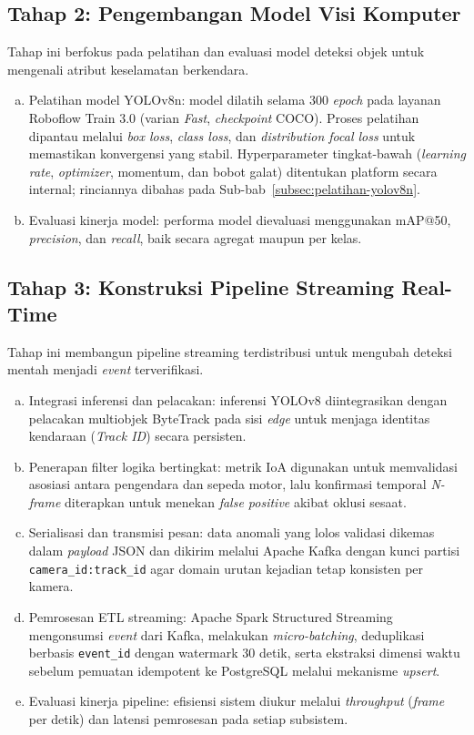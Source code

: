 \subsection{Tahap 2: Pengembangan Model Visi Komputer}
Tahap ini berfokus pada pelatihan dan evaluasi model deteksi objek untuk mengenali atribut keselamatan berkendara.
\begin{enumerate}[a.]
\item {Pelatihan model YOLOv8n}: model dilatih selama 300 \textit{epoch} pada layanan Roboflow Train 3.0 (varian \textit{Fast}, \textit{checkpoint} COCO). Proses pelatihan dipantau melalui \textit{box loss}, \textit{class loss}, dan \textit{distribution focal loss} untuk memastikan konvergensi yang stabil. Hyperparameter tingkat-bawah (\textit{learning rate}, \textit{optimizer}, momentum, dan bobot galat) ditentukan platform secara internal; rinciannya dibahas pada Sub-bab~\ref{subsec:pelatihan-yolov8n}.
\item {Evaluasi kinerja model}: performa model dievaluasi menggunakan mAP@50, \textit{precision}, dan \textit{recall}, baik secara agregat maupun per kelas.
\end{enumerate}

\subsection{Tahap 3: Konstruksi Pipeline Streaming Real-Time}
Tahap ini membangun pipeline streaming terdistribusi untuk mengubah deteksi mentah menjadi \textit{event} terverifikasi.
\begin{enumerate}[a.]
\item {Integrasi inferensi dan pelacakan}: inferensi YOLOv8 diintegrasikan dengan pelacakan multiobjek ByteTrack pada sisi \textit{edge} untuk menjaga identitas kendaraan (\textit{Track ID}) secara persisten.
\item {Penerapan filter logika bertingkat}: metrik IoA digunakan untuk memvalidasi asosiasi antara pengendara dan sepeda motor, lalu konfirmasi temporal \textit{N-frame} diterapkan untuk menekan \textit{false positive} akibat oklusi sesaat.
\item {Serialisasi dan transmisi pesan}: data anomali yang lolos validasi dikemas dalam \textit{payload} JSON dan dikirim melalui Apache Kafka dengan kunci partisi \texttt{camera\_id:track\_id} agar domain urutan kejadian tetap konsisten per kamera.
\item {Pemrosesan ETL streaming}: Apache Spark Structured Streaming mengonsumsi \textit{event} dari Kafka, melakukan \textit{micro-batching}, deduplikasi berbasis \texttt{event\_id} dengan watermark 30 detik, serta ekstraksi dimensi waktu sebelum pemuatan idempotent ke PostgreSQL melalui mekanisme \textit{upsert}.
\item {Evaluasi kinerja pipeline}: efisiensi sistem diukur melalui \textit{throughput} (\textit{frame} per detik) dan latensi pemrosesan pada setiap subsistem.
\end{enumerate}

